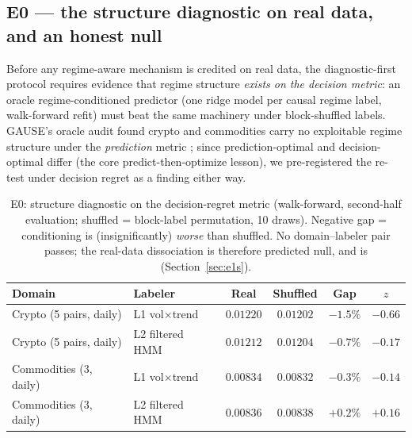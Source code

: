 \documentclass{article}
\begin{document}
\subsection{E0 --- the structure diagnostic on real data, and an honest
null}
\label{sec:e0}

Before any regime-aware mechanism is credited on real data, the
diagnostic-first protocol requires evidence that regime structure
\emph{exists on the decision metric}: an oracle regime-conditioned
predictor (one ridge model per causal regime label, walk-forward refit)
must beat the same machinery under block-shuffled labels. GAUSE's oracle
audit found crypto and commodities carry no exploitable regime structure
under the \emph{prediction} metric \citep{li2026gause}; since
prediction-optimal and decision-optimal differ (the core
predict-then-optimize lesson), we pre-registered the re-test under
decision regret as a finding either way.

\begin{table}[t]
\centering
\small
\caption{E0: structure diagnostic on the decision-regret metric
(walk-forward, second-half evaluation; shuffled = block-label permutation,
10 draws). Negative gap = conditioning is (insignificantly) \emph{worse}
than shuffled. No domain--labeler pair passes; the real-data dissociation
is therefore predicted null, and is (Section~\ref{sec:e1s}).}
\label{tab:e0}
\begin{tabular}{llcccc}
\toprule
\textbf{Domain} & \textbf{Labeler} & \textbf{Real} & \textbf{Shuffled} &
\textbf{Gap} & \textbf{$z$} \\
\midrule
Crypto (5 pairs, daily)      & L1 vol$\times$trend & $0.01220$ & $0.01202$ & $-1.5\%$ & $-0.66$ \\
Crypto (5 pairs, daily)      & L2 filtered HMM     & $0.01212$ & $0.01204$ & $-0.7\%$ & $-0.17$ \\
Commodities (3, daily)       & L1 vol$\times$trend & $0.00834$ & $0.00832$ & $-0.3\%$ & $-0.14$ \\
Commodities (3, daily)       & L2 filtered HMM     & $0.00836$ & $0.00838$ & $+0.2\%$ & $+0.16$ \\
\bottomrule
\end{tabular}
\end{table}
\end{document}

